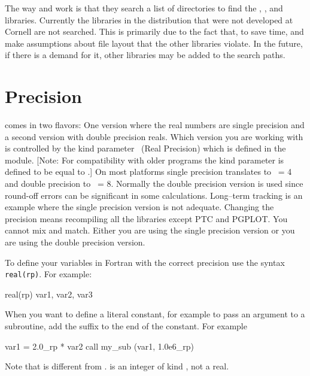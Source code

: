 The way  and  work is that they search a list of
directories to find the \bmad, , and 
libraries. Currently the libraries in the \bmad distribution that were
not developed at Cornell are not searched. This is primarily due to
the fact that, to save time,  and  make assumptions
about file layout that the other libraries violate. In the future, if
there is a demand for it, other libraries may be added to the search
paths.

\section{Precision}
\label{s:precision}

\bmad comes in two flavors: One version where the real numbers are single
precision and a second version with double precision reals. Which
version you are working with is controlled by the kind parameter \
(Real Precision) which is defined in the 
module. [Note: For compatibility with older programs the kind parameter
\vn{rdef} is defined to be equal to .]  On most platforms single
precision translates to \vn{rp}\ = 4 and double precision to \vn{rp}\ =
8. Normally the double precision version is used since round-off
errors can be significant in some calculations. Long--term tracking is
an example where the single precision version is not adequate. Changing 
the precision means recompiling all the libraries except PTC and PGPLOT. 
You cannot mix and match. Either you are using the single precision version
or you are using the double precision version.

To define your variables in Fortran with the correct precision use the syntax
{\tt real(rp)}. For example:
\begin{example}
    real(rp) var1, var2, var3
\end{example}
When you want to define a literal constant, for example to pass an
argument to a subroutine, add the suffix \vn{_rp} to the end of the
constant. For example
\begin{example}
   var1 =  2.0_rp * var2
   call my_sub (var1, 1.0e6_rp)
\end{example}
Note that  is different from .  is an
integer of kind \vn{rp}, not a real.



